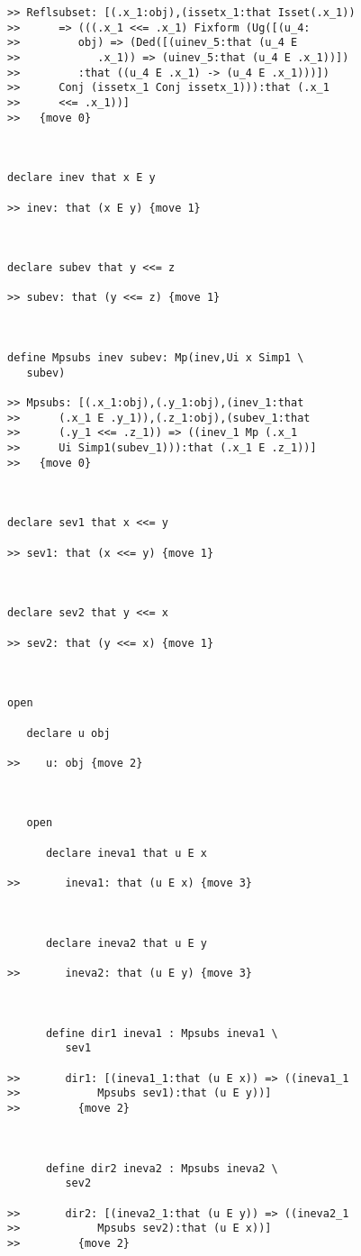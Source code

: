 \documentclass[12pt]{article}
\begin{document}
\begin{verbatim}
>> Reflsubset: [(.x_1:obj),(issetx_1:that Isset(.x_1))
>>      => (((.x_1 <<= .x_1) Fixform (Ug([(u_4:
>>         obj) => (Ded([(uinev_5:that (u_4 E
>>            .x_1)) => (uinev_5:that (u_4 E .x_1))])
>>         :that ((u_4 E .x_1) -> (u_4 E .x_1)))])
>>      Conj (issetx_1 Conj issetx_1))):that (.x_1
>>      <<= .x_1))]
>>   {move 0}



declare inev that x E y

>> inev: that (x E y) {move 1}



declare subev that y <<= z

>> subev: that (y <<= z) {move 1}



define Mpsubs inev subev: Mp(inev,Ui x Simp1 \
   subev)

>> Mpsubs: [(.x_1:obj),(.y_1:obj),(inev_1:that
>>      (.x_1 E .y_1)),(.z_1:obj),(subev_1:that
>>      (.y_1 <<= .z_1)) => ((inev_1 Mp (.x_1
>>      Ui Simp1(subev_1))):that (.x_1 E .z_1))]
>>   {move 0}



declare sev1 that x <<= y

>> sev1: that (x <<= y) {move 1}



declare sev2 that y <<= x

>> sev2: that (y <<= x) {move 1}



open

   declare u obj

>>    u: obj {move 2}



   open

      declare ineva1 that u E x

>>       ineva1: that (u E x) {move 3}



      declare ineva2 that u E y

>>       ineva2: that (u E y) {move 3}



      define dir1 ineva1 : Mpsubs ineva1 \
         sev1

>>       dir1: [(ineva1_1:that (u E x)) => ((ineva1_1
>>            Mpsubs sev1):that (u E y))]
>>         {move 2}



      define dir2 ineva2 : Mpsubs ineva2 \
         sev2

>>       dir2: [(ineva2_1:that (u E y)) => ((ineva2_1
>>            Mpsubs sev2):that (u E x))]
>>         {move 2}




\end{verbatim}
\end{document}
